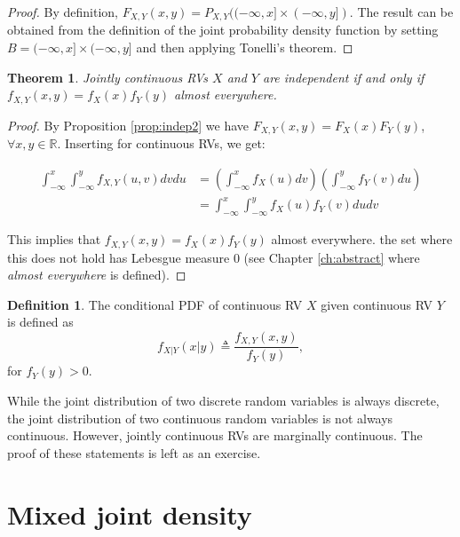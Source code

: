 \documentclass{book}
\theoremstyle{plain}%
\newtheorem{theorem}{Theorem}[section]
\theoremstyle{definition}
\newtheorem{definition}{Definition}[section]
\begin{document}
\begin{proof}
 By definition, $F_{X,Y}(x,y) = P_{X,Y}((-\infty, x] \times (-\infty, y])$. The result can be obtained from the definition of the joint probability density function by setting $B = (-\infty, x] \times (-\infty, y]$ and then applying Tonelli's theorem.
\end{proof}

\begin{theorem}
Jointly continuous RVs $X$ and $Y$ are independent if and only if $f_{X,Y}(x,y) = f_X(x)f_Y(y)$ almost everywhere.
\end{theorem}

\begin{proof}
By Proposition \ref{prop:indep2} we have $F_{X,Y}(x,y) = F_X(x)F_Y(y)$, $\forall x,y \in \mathbb{R}$. Inserting for continuous RVs, we get:

\begin{align*}
\int_{-\infty}^x \int_{-\infty}^y f_{X,Y}(u,v)dv du &= \left(\int_{-\infty}^x f_{X}(u)dv\right)\left( \int_{-\infty}^y f_{Y}(v)du\right)\\
&= \int_{-\infty}^x \int_{-\infty}^y f_{X}(u) f_{Y}(v)du dv
\end{align*}

This implies that $f_{X,Y}(x,y) = f_{X}(x)f_{Y}(y)$ almost everywhere. the set where this does not hold has Lebesgue measure 0 (see Chapter \ref{ch:abstract} where \emph{almost everywhere} is defined).
\end{proof}

\begin{definition}
The conditional PDF of continuous RV $X$ given continuous RV $Y$ is defined as
$$f_{X|Y}(x|y) \triangleq \frac{f_{X,Y}(x,y)}{f_Y(y)},$$
for $f_Y(y) > 0$.
\end{definition}


While the joint distribution of two discrete random variables is always discrete, the joint distribution of two continuous random variables is not always continuous. However, jointly continuous RVs are marginally continuous. The proof of these statements is left as an exercise.

\section{Mixed joint density}
\end{document}
